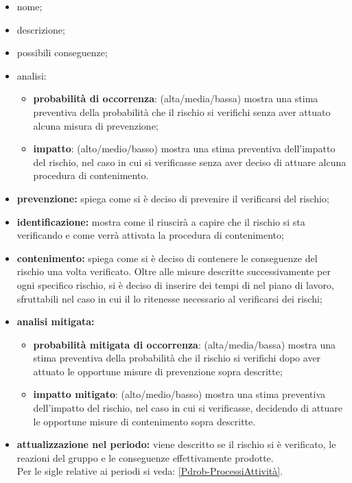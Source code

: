 	 \begin{itemize}
	 \item {nome};
	 \item {descrizione};
	 \item {possibili conseguenze};
	 \item {analisi}:
	 	\begin{itemize}
	 	\item \textbf{probabilità di occorrenza}: (alta/media/bassa) mostra una stima preventiva della probabilità che il rischio si verifichi senza aver attuato alcuna misura di prevenzione;
	 	\item \textbf{impatto}: (alto/medio/basso) mostra una stima preventiva dell'impatto del rischio, nel caso in cui si verificasse senza aver deciso di attuare alcuna procedura di contenimento.
	 	\end{itemize}
	 \item \textbf{{prevenzione}:} spiega come si è deciso di prevenire il verificarsi del rischio;
	 \item \textbf{{identificazione}:} mostra come il  riuscirà a capire che il rischio si sta verificando e come verrà attivata la procedura di contenimento;
	 \item \textbf{{contenimento}:} spiega come si è deciso di contenere le conseguenze del rischio una volta verificato. Oltre alle misure descritte successivamente per ogni specifico rischio, si è deciso di inserire dei tempi di  nel piano di lavoro, sfruttabili nel caso in cui il \responsabilediprogetto{} lo ritenesse necessario al verificarsi dei rischi;
	 \item \textbf{{analisi mitigata}:}
	 \begin{itemize}
	 	\item \textbf{probabilità mitigata di occorrenza}: (alta/media/bassa) mostra una stima preventiva della probabilità che il rischio si verifichi dopo aver attuato le opportune misure di prevenzione sopra descritte;
	 	\item \textbf{impatto mitigato}: (alto/medio/basso) mostra una stima preventiva dell'impatto del rischio, nel caso in cui si verificasse, decidendo di attuare le opportune misure di contenimento sopra descritte.
	 \end{itemize}

	 \item \textbf{{attualizzazione nel periodo}:} viene descritto se il rischio si è verificato, le reazioni del gruppo e le conseguenze effettivamente prodotte.
	 \\Per le sigle relative ai periodi si veda: \ref{Pdrob-ProcessiAttività}.
	 \end{itemize}
	 
